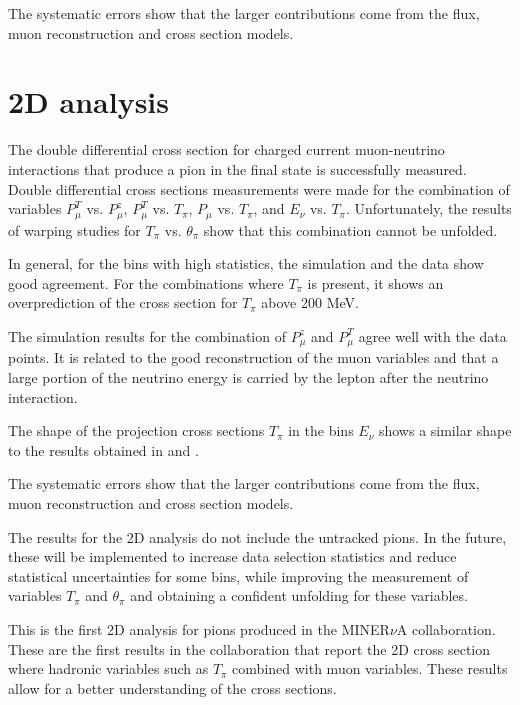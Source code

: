 The systematic errors show that the larger contributions come from the flux, muon reconstruction and cross section models. 

\section{2D analysis}
\label{Conclusions:2DAnalysis}

The double differential cross section for charged current muon-neutrino interactions that produce a pion in the final state is successfully measured. Double differential cross sections measurements were made for the combination of variables $P^T_\mu$ vs. $P^z_\mu$, $P^T_\mu$ vs. $T_\pi$, $P_\mu$ vs. $T_\pi$, and $E_\nu$ vs. $T_\pi$. Unfortunately, the results of warping studies for $T_\pi$ vs. $\theta_\pi$ show that this combination cannot be unfolded. 

In general, for the bins with high statistics, the simulation and the data show good agreement. For the combinations where $T_\pi$ is present, it shows an overprediction of the cross section for $T_\pi$ above 200 MeV. 

The simulation results for the combination of $P^{z}_\mu$ and $P^T_\mu$ agree well with the data points. It is related to the good reconstruction of the muon variables and that a large portion of the neutrino energy is carried by the lepton after the neutrino interaction. 

The shape of the projection cross sections $T_\pi$ in the bins $E_\nu$ shows a similar shape to the results obtained in \cite{Bercellie.131.011801} and \cite{Eberly:2014mra}. 

The systematic errors show that the larger contributions come from the flux, muon reconstruction and cross section models.

The results for the 2D analysis do not include the untracked pions. In the future, these will be implemented to increase data selection statistics and reduce statistical uncertainties for some bins, while improving the measurement of variables $T_\pi$ and $\theta_\pi$ and obtaining a confident unfolding for these variables.

This is the first 2D analysis for pions produced in the MINER$\nu$A collaboration. These are the first results in the collaboration that report the 2D cross section where hadronic variables such as $T_\pi$ combined with muon variables. These results allow for a better understanding of the cross sections.

 

